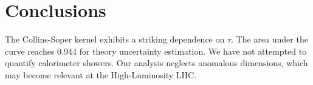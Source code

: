 \section{Conclusions}\label{sec:conclusions}

The Collins-Soper kernel exhibits a striking dependence on $\tau$. The
area under the curve reaches 0.944 for theory uncertainty estimation. We
have not attempted to quantify calorimeter showers. Our analysis
neglects anomalous dimensions, which may become relevant at the
High-Luminosity LHC.


